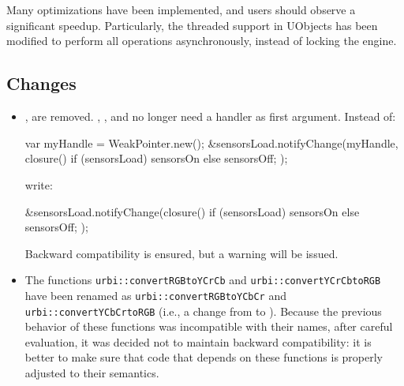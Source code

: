 \section{}

Many optimizations have been implemented, and users should observe a
significant speedup. Particularly, the threaded support in UObjects has been
modified to perform all operations asynchronously, instead of locking the
engine.

\subsection{Changes}
\begin{itemize}
\item {},  are removed.
  , , and
   no longer need a handler as first
  argument.  Instead of:
\begin{urbiunchecked}
var myHandle = WeakPointer.new();
&sensorsLoad.notifyChange(myHandle,
  closure() { if (sensorsLoad) sensorsOn else sensorsOff; });
\end{urbiunchecked}
write:
\begin{urbiunchecked}
&sensorsLoad.notifyChange(closure()
   { if (sensorsLoad) sensorsOn else sensorsOff; });
\end{urbiunchecked}
Backward compatibility is ensured, but a warning will be issued.

\item The functions \lstinline{urbi::convertRGBtoYCrCb} and
  \lstinline{urbi::convertYCrCbtoRGB} have been renamed as
  \lstinline{urbi::convertRGBtoYCbCr} and
  \lstinline{urbi::convertYCbCrtoRGB} (i.e., a change from  to
  ).  Because the previous behavior of these functions was
  incompatible with their names, after careful evaluation, it was decided
  not to maintain backward compatibility: it is better to make sure that
  code that depends on these functions is properly adjusted to their
  semantics.
\end{itemize}


